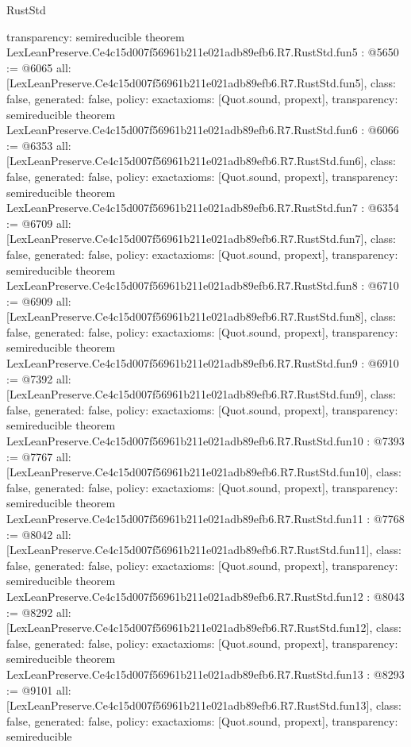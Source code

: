 \begin{lexlean}{RustStd}
\begin{coremodule}
{  transparency: semireducible
}
theorem LexLeanPreserve.Ce4c15d007f56961b211e021adb89efb6.R7.RustStd.fun5 : @5650 := @6065 {
  all: [LexLeanPreserve.Ce4c15d007f56961b211e021adb89efb6.R7.RustStd.fun5],
  class: false,
  generated: false,
  policy: exact{axioms: [Quot.sound, propext]},
  transparency: semireducible
}
theorem LexLeanPreserve.Ce4c15d007f56961b211e021adb89efb6.R7.RustStd.fun6 : @6066 := @6353 {
  all: [LexLeanPreserve.Ce4c15d007f56961b211e021adb89efb6.R7.RustStd.fun6],
  class: false,
  generated: false,
  policy: exact{axioms: [Quot.sound, propext]},
  transparency: semireducible
}
theorem LexLeanPreserve.Ce4c15d007f56961b211e021adb89efb6.R7.RustStd.fun7 : @6354 := @6709 {
  all: [LexLeanPreserve.Ce4c15d007f56961b211e021adb89efb6.R7.RustStd.fun7],
  class: false,
  generated: false,
  policy: exact{axioms: [Quot.sound, propext]},
  transparency: semireducible
}
theorem LexLeanPreserve.Ce4c15d007f56961b211e021adb89efb6.R7.RustStd.fun8 : @6710 := @6909 {
  all: [LexLeanPreserve.Ce4c15d007f56961b211e021adb89efb6.R7.RustStd.fun8],
  class: false,
  generated: false,
  policy: exact{axioms: [Quot.sound, propext]},
  transparency: semireducible
}
theorem LexLeanPreserve.Ce4c15d007f56961b211e021adb89efb6.R7.RustStd.fun9 : @6910 := @7392 {
  all: [LexLeanPreserve.Ce4c15d007f56961b211e021adb89efb6.R7.RustStd.fun9],
  class: false,
  generated: false,
  policy: exact{axioms: [Quot.sound, propext]},
  transparency: semireducible
}
theorem LexLeanPreserve.Ce4c15d007f56961b211e021adb89efb6.R7.RustStd.fun10 : @7393 := @7767 {
  all: [LexLeanPreserve.Ce4c15d007f56961b211e021adb89efb6.R7.RustStd.fun10],
  class: false,
  generated: false,
  policy: exact{axioms: [Quot.sound, propext]},
  transparency: semireducible
}
theorem LexLeanPreserve.Ce4c15d007f56961b211e021adb89efb6.R7.RustStd.fun11 : @7768 := @8042 {
  all: [LexLeanPreserve.Ce4c15d007f56961b211e021adb89efb6.R7.RustStd.fun11],
  class: false,
  generated: false,
  policy: exact{axioms: [Quot.sound, propext]},
  transparency: semireducible
}
theorem LexLeanPreserve.Ce4c15d007f56961b211e021adb89efb6.R7.RustStd.fun12 : @8043 := @8292 {
  all: [LexLeanPreserve.Ce4c15d007f56961b211e021adb89efb6.R7.RustStd.fun12],
  class: false,
  generated: false,
  policy: exact{axioms: [Quot.sound, propext]},
  transparency: semireducible
}
theorem LexLeanPreserve.Ce4c15d007f56961b211e021adb89efb6.R7.RustStd.fun13 : @8293 := @9101 {
  all: [LexLeanPreserve.Ce4c15d007f56961b211e021adb89efb6.R7.RustStd.fun13],
  class: false,
  generated: false,
  policy: exact{axioms: [Quot.sound, propext]},
  transparency: semireducible
}
\end{coremodule}
\end{lexlean}
